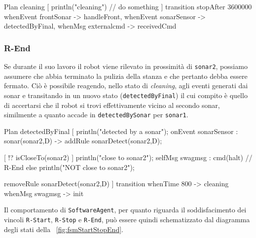 \documentclass{../llncs}
\newcommand{\codescript}[1]{{\mbox{\small{\texttt{#1}}}}\xspace}
\newcommand{\code}[1]{{\color{blue}\small{\texttt{#1}}}}
\newcommand{\xf}[1]{\figurename~\ref{fig:#1}}
\begin{document}

\begin{qacode}[caption={SoftwareAgent, pt3}]
Plan cleaning [
	println("cleaning")
	// do something
]
transition stopAfter 3600000 
	whenEvent frontSonar -> handleFront,
	whenEvent sonarSensor -> detectedByFinal,
	whenMsg externalcmd -> receivedCmd
\end{qacode}

\subsubsection{R-End}
Se durante il suo lavoro il robot viene rilevato in prossimità di \code{sonar2}, possiamo assumere che abbia terminato la pulizia della stanza e che pertanto debba essere fermato. Ciò è possibile reagendo, nello stato di \emph{cleaning}, agli eventi generati dai sonar e transitando in un nuovo stato (\codescript{detectedByFinal}) il cui compito è quello di accertarsi che il robot si trovi effettivamente vicino al secondo sonar, similmente a quanto accade in \codescript{detectedBySonar} per \code{sonar1}.\\

\begin{qacode}[caption={SoftwareAgent, pt4}]
Plan detectedByFinal [
	println("detected by a sonar");
	onEvent sonarSensor : sonar(sonar2,D) -> addRule sonarDetect(sonar2,D);

	[ !? isCloseTo(sonar2) ] {
		println("close to sonar2");
		selfMsg swagmsg : cmd(halt) // R-End
	}
	else
		println("NOT close to sonar2");
	
	removeRule sonarDetect(sonar2,D)
]
transition
	whenTime 800 -> cleaning
	whenMsg swagmsg -> init
\end{qacode}

\vspace{16px}

Il comportamento di \texttt{SoftwareAgent}, per quanto riguarda il soddisfacimento dei vincoli \code{R-Start}, \code{R-Stop} e \code{R-End}, può essere quindi schematizzato dal diagramma degli stati della \xf{fsmStartStopEnd}.
\end{document}
